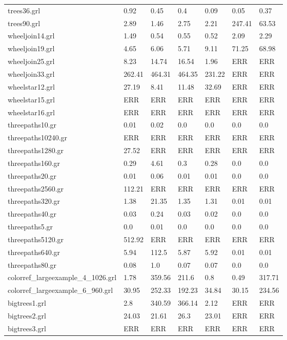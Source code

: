 \documentclass[11pt]{article}
\begin{document}
\begin{table}[h!]
\begin{tabularx}{\textwidth}{|l|X|X|X|X|X|X|}
		trees36.grl & 0.92 & 0.45 & 0.4 & 0.09 & 0.05 & 0.37 \\
		trees90.grl & 2.89 & 1.46 & 2.75 & 2.21 & 247.41 & 63.53 \\
		wheeljoin14.grl & 1.49 & 0.54 & 0.55 & 0.52 & 2.09 & 2.29 \\
		wheeljoin19.grl & 4.65 & 6.06 & 5.71 & 9.11 & 71.25 & 68.98 \\
		wheeljoin25.grl & 8.23 & 14.74 & 16.54 & 1.96 & ERR & ERR \\
		wheeljoin33.grl & 262.41 & 464.31 & 464.35 & 231.22 & ERR & ERR \\
		wheelstar12.grl & 27.19 & 8.41 & 11.48 & 32.69 & ERR & ERR \\
		wheelstar15.grl & ERR & ERR & ERR & ERR & ERR & ERR \\
		wheelstar16.grl & ERR & ERR & ERR & ERR & ERR & ERR \\
		threepaths10.gr & 0.01 & 0.02 & 0.0 & 0.0 & 0.0 & 0.0 \\
		threepaths10240.gr & ERR & ERR & ERR & ERR & ERR & ERR \\
		threepaths1280.gr & 27.52 & ERR & ERR & ERR & ERR & ERR \\
		threepaths160.gr & 0.29 & 4.61 & 0.3 & 0.28 & 0.0 & 0.0 \\
		threepaths20.gr & 0.01 & 0.06 & 0.01 & 0.01 & 0.0 & 0.0 \\
		threepaths2560.gr & 112.21 & ERR & ERR & ERR & ERR & ERR \\
		threepaths320.gr & 1.38 & 21.35 & 1.35 & 1.31 & 0.01 & 0.01 \\
		threepaths40.gr & 0.03 & 0.24 & 0.03 & 0.02 & 0.0 & 0.0 \\
		threepaths5.gr & 0.0 & 0.01 & 0.0 & 0.0 & 0.0 & 0.0 \\
		threepaths5120.gr & 512.92 & ERR & ERR & ERR & ERR & ERR \\
		threepaths640.gr & 5.94 & 112.5 & 5.87 & 5.92 & 0.01 & 0.01 \\
		threepaths80.gr & 0.08 & 1.0 & 0.07 & 0.07 & 0.0 & 0.0 \\
		colorref\_largeexample\_4\_1026.grl & 1.78 & 359.56 & 211.6 & 0.8 & 0.49 & 317.71 \\
		colorref\_largeexample\_6\_960.grl & 30.95 & 252.33 & 192.23 & 34.84 & 30.15 & 234.56 \\
		bigtrees1.grl & 2.8 & 340.59 & 366.14 & 2.12 & ERR & ERR \\
		bigtrees2.grl & 24.03 & 21.61 & 26.3 & 23.01 & ERR & ERR \\
		bigtrees3.grl & ERR & ERR & ERR & ERR & ERR & ERR \\

\end{tabularx}
\end{table}
\end{document}
